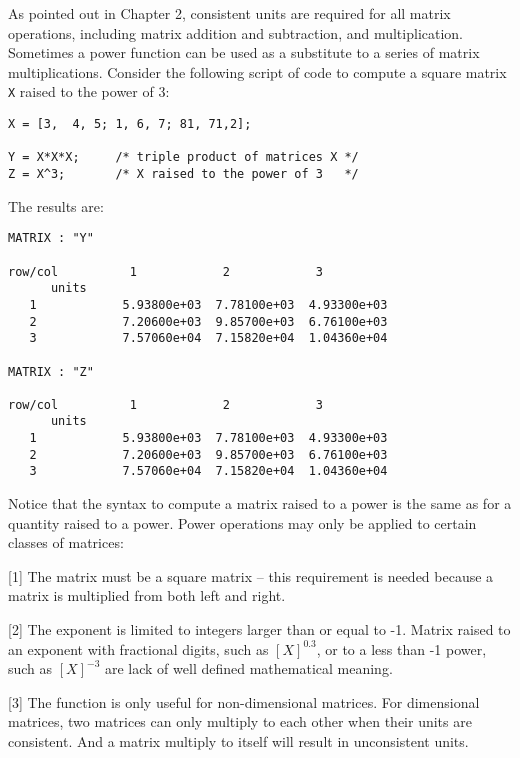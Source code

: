 \vspace{0.15 in}\noindent
As pointed out in Chapter 2, consistent units are required for all matrix operations, 
including matrix addition and subtraction, and multiplication.
Sometimes a power function can be used as a
substitute to a series of matrix multiplications.
Consider the following script of code to compute a square matrix
{\tt X} raised to the power of 3:

\begin{footnotesize}
\begin{verbatim}
X = [3,  4, 5; 1, 6, 7; 81, 71,2];

Y = X*X*X;     /* triple product of matrices X */
Z = X^3;       /* X raised to the power of 3   */
\end{verbatim}
\end{footnotesize}

\noindent The results are:
\begin{footnotesize}
\begin{verbatim}
MATRIX : "Y"

row/col          1            2            3          
      units                                 
   1            5.93800e+03  7.78100e+03  4.93300e+03
   2            7.20600e+03  9.85700e+03  6.76100e+03
   3            7.57060e+04  7.15820e+04  1.04360e+04

MATRIX : "Z"

row/col          1            2            3          
      units                                 
   1            5.93800e+03  7.78100e+03  4.93300e+03
   2            7.20600e+03  9.85700e+03  6.76100e+03
   3            7.57060e+04  7.15820e+04  1.04360e+04
\end{verbatim}
\end{footnotesize}

\vspace{0.15 in}\noindent
Notice that the syntax to compute a matrix raised to a power
is the same as for a quantity raised to a power. 
Power operations may only be applied to certain classes of matrices:

\vspace{0.10 in}
\begin{description}
\item{[1]}
The matrix must be a square matrix -- this requirement is needed because a
matrix is multiplied from both left and right.
\item{[2]}
The exponent is limited to integers larger than or equal to -1.
Matrix raised to an exponent with fractional digits, such as $ [X]^{0.3}$,
or to a less than -1 power, such as 
$ [X]^{-3}$ are lack of well defined mathematical meaning.
\item{[3]}
The function is only useful for non-dimensional matrices. For dimensional matrices,
two matrices can only multiply to each other when their units are consistent. And a matrix
multiply to itself will result in unconsistent units.
\end{description}


